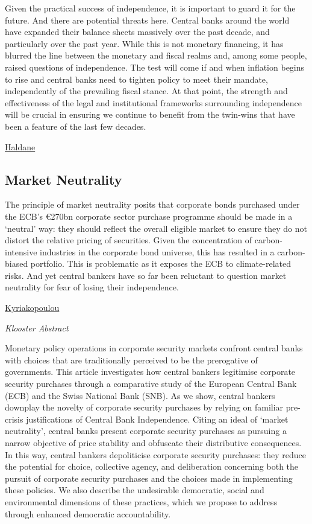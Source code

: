 \documentclass[
]{book}
\begin{document}
Given the practical success of independence, it is important to guard it for the future. And there are potential threats here. Central banks around the world have expanded their balance sheets massively over the past decade, and particularly over the past year. While this is not monetary financing, it has blurred the line between the monetary and fiscal realms and, among some people, raised questions of independence. The test will come if and when inflation begins to rise and central banks need to tighten policy to meet their mandate, independently of the prevailing fiscal stance. At that point, the strength and effectiveness of the legal and institutional frameworks surrounding independence will be crucial in ensuring we continue to benefit from the twin-wins that have been a feature of the last few decades.

\href{https://bankplassen.norges-bank.no/2021/04/16/central-bank-independence-a-practitioners-perspective/\#more-1994}{Haldane}

\hypertarget{market-neutrality}{%
\subsection{Market Neutrality}\label{market-neutrality}}

The principle of market neutrality posits that corporate bonds purchased under the ECB's €270bn corporate sector purchase programme should be made in a `neutral' way: they should reflect the overall eligible market to ensure they do not distort the relative pricing of securities. Given the concentration of carbon-intensive industries in the corporate bond universe, this has resulted in a carbon-biased portfolio. This is problematic as it exposes the ECB to climate-related risks. And yet central bankers have so far been reluctant to question market neutrality for fear of losing their independence.

\href{https://www.omfif.org/2021/02/ecb-market-neutrality-crumbling/}{Kyriakopoulou}

\emph{Klooster Abstract}

Monetary policy operations in corporate security markets confront central
banks with choices that are traditionally perceived to be the prerogative of
governments. This article investigates how central bankers legitimise
corporate security purchases through a comparative study of the
European Central Bank (ECB) and the Swiss National Bank (SNB). As we
show, central bankers downplay the novelty of corporate security
purchases by relying on familiar pre-crisis justifications of Central Bank
Independence. Citing an ideal of `market neutrality', central banks
present corporate security purchases as pursuing a narrow objective of
price stability and obfuscate their distributive consequences. In this way,
central bankers depoliticise corporate security purchases: they reduce
the potential for choice, collective agency, and deliberation concerning
both the pursuit of corporate security purchases and the choices made
in implementing these policies. We also describe the undesirable
democratic, social and environmental dimensions of these practices,
which we propose to address through enhanced democratic
accountability.
\end{document}
